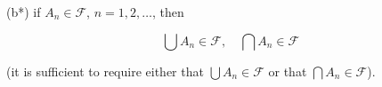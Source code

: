 (b*) if $A_n \in \mathcal{F}$, $n = 1, 2, \ldots$, then

$$\bigcup A_n \in \mathcal{F}, \quad \bigcap A_n \in \mathcal{F}$$

(it is sufficient to require either that $\bigcup A_n \in \mathcal{F}$ or that $\bigcap A_n \in \mathcal{F}$).
